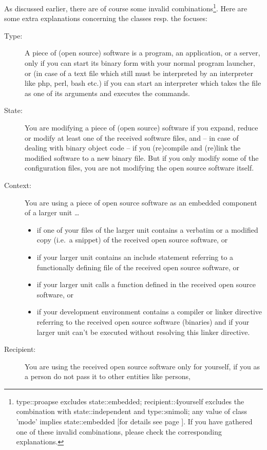 
As discussed earlier, there are of course some invalid
combinations\footnote{type::proapse excludes state::embedded;
recipient::4yourself excludes the combination with state::independent and
type::snimoli; any value of class 'mode' implies state::embedded [for details
see page \pageref{InvalidFinderTokenCombinations}]. If you have gathered one of
these invalid combinations, please check the corresponding explanations.}. Here
are some extra explanations concerning the classes resp. the focuses:

\begin{description}
\item[Type:] A piece of (open source) software is a program, an application, or
a server, only if you can start its binary form with your normal program
launcher, or (in case of a text file which still must be interpreted by an
interpreter like php, perl, bash etc.) if you can start an interpreter which
takes the file as one of its arguments and executes the commands.
\item[State:] You are modifying a piece of (open source) software if you expand,
reduce or modify at least one of the received software files, and -- in case of
dealing with binary object code -- if you (re)compile and (re)link the modified
software to a new binary file. But if you only modify some of the configuration
files, you are not modifying the open source software itself.
\item[Context:] You are using a piece of open source software as an embedded
component of a larger unit \ldots
  \begin{itemize}
  \item  if one of your files of the larger unit contains a verbatim or a
  modified copy (i.e.\ a snippet) of the received open source software, or
  \item if your larger unit contains an include statement referring to a
  functionally defining file of the received open source software, or
  \item if your larger unit calls a function defined in the received open source
  software, or
  \item if your development environment contains a compiler or linker directive
  referring to the received open source software (binaries) and if your larger
  unit can't be executed without resolving this linker directive.
  \end{itemize}
\item[Recipient:] You are using the received open source software only for
yourself, if you as a person do not pass it to other entities like persons,

\end{description}
